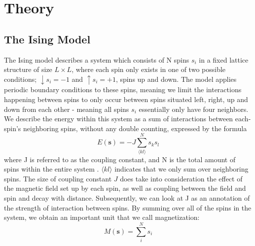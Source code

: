\documentclass[10pt, nofootinbib, twocolumn]{revtex4-1}
\begin{document}
\newpage
\section{Theory}\label{sec:theory}
\subsection{The Ising Model}\label{sec:Ising}
The Ising model describes a system which consists of N spins $s_i$ in a fixed lattice structure of size $L \times L$, where each spin only exists in one of two possible conditions; $\downarrow s_i=-1$ and $\uparrow s_i=+1$, spins up and down. The model applies periodic boundary conditions to these spins, meaning we limit the interactions happening between spins to only occur between spins situated left, right, up and down from each other - meaning all spins $s_i$ essentially only have four neighbors. We describe the energy within this system as a sum of interactions between each-spin's neighboring spins, without any double counting, expressed by the formula 
\begin{equation}\label{eq:en1}
E(\mathbf{s}) = -J \sum\limits_{\langle kl \rangle}^{N} s_k s_l
\end{equation}
where J is referred to as the coupling constant, and N is the total amount of spins within the entire system \cite[p.~194]{stats}. $\langle kl \rangle$ indicates that we only sum over neighboring spins. The size of coupling constant $J$ does take into consideration the effect of the magnetic field set up by each spin, as well as coupling between the field and spin and decay with distance. Subsequently, we can look at J as an annotation of the strength of interaction between spins. By summing over all of the spins in the system, we obtain an important unit that we call magnetization:
\begin{equation}
 M(\mathbf{s}) = \sum\limits_{i}^{N} s_i
\end{equation}
\end{document}
